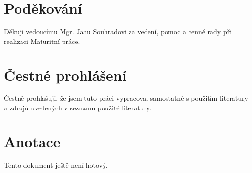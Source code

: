 \documentclass[main.tex]{subfiles}
\begin{document}
\section*{Poděkování}
Děkuji vedoucímu Mgr. Janu Souhradovi za vedení, pomoc a cenné rady při realizaci Maturitní práce. 

\section*{Čestné prohlášení}
Čestně prohlašuji, že jsem tuto práci vypracoval samostatně s použitím literatury a zdrojů uvedených v seznamu použité literatury.

\section*{Anotace}
Tento dokument ještě není hotový.
\end{document}
